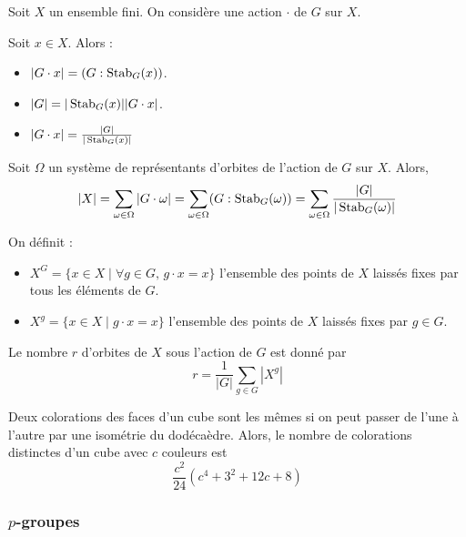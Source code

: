 	
	Soit $X$ un ensemble fini. On considère une action $\cdot$ de $G$ sur $X$.
	
	\begin{proposition}
		Soit $x \in X$. Alors :
		\begin{itemize}
			\item $|G \cdot x| = (G : \operatorname{Stab}_G(x))$.
			\item $|G| = |\operatorname{Stab}_G(x)| |G \cdot x|$.
			\item $|G \cdot x| = \frac{|G|}{|\operatorname{Stab}_G(x)|}$
		\end{itemize}
	\end{proposition}
	
	\begin{theorem}
		Soit $\Omega$ un système de représentants d'orbites de l'action de $G$ sur $X$. Alors,
		\[ |X| = \sum_{\omega \in \Omega} |G \cdot \omega| = \sum_{\omega \in \Omega} (G : \operatorname{Stab}_G(\omega)) = \sum_{\omega \in \Omega} \frac{|G|}{|\operatorname{Stab}_G(\omega)|} \]
	\end{theorem}
	
	\begin{definition}
		On définit :
		\begin{itemize}
			\item $X^G = \{ x \in X \mid \forall g \in G, \, g \cdot x = x \}$ l'ensemble des points de $X$ laissés fixes par tous les éléments de $G$.
			\item $X^g = \{ x \in X \mid g \cdot x = x \}$ l'ensemble des points de $X$ laissés fixes par $g \in G$.
		\end{itemize}
	\end{definition}
	
	\begin{theorem}
		Le nombre $r$ d'orbites de $X$ sous l'action de $G$ est donné par
		\[ r = \frac{1}{|G|} \sum_{g \in G} |X^g| \]
	\end{theorem}
	
	
	\begin{application}
		Deux colorations des faces d'un cube sont les mêmes si on peut passer de l'une à l'autre par une isométrie du dodécaèdre. Alors, le nombre de colorations distinctes d'un cube avec $c$ couleurs est
		\[ \frac{c^2}{24} (c^4 + 3^2 + 12c + 8) \]
	\end{application}
	
	\subsubsection{\texorpdfstring{$p$}{p}-groupes}
	
